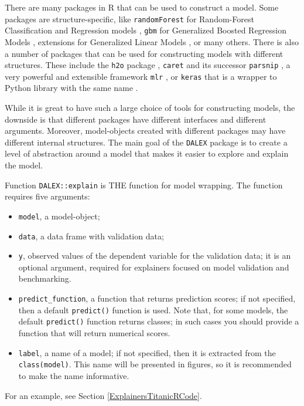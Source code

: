 \documentclass[12pt,]{krantz}
\providecommand{\tightlist}{%
  \setlength{\itemsep}{0pt}\setlength{\parskip}{0pt}}
\begin{document}
There are many packages in R that can be used to construct a model. Some packages are structure-specific, like \texttt{randomForest} for Random-Forest Classification and Regression models \citep{randomForest}, \texttt{gbm} for Generalized Boosted Regression Models \citep{gbm}, extensions for Generalized Linear Models \citep{rms}, or many others. There is also a number of packages that can be used for constructing models with different structures. These include the \texttt{h2o} package \citep{h2oPackage}, \texttt{caret} \citep{caret} and its successor \texttt{parsnip} \citep{parsnipPackage}, a very powerful and extensible framework \texttt{mlr} \citep{mlr}, or \texttt{keras} that is a wrapper to Python library with the same name \citep{kerasPackage}.

While it is great to have such a large choice of tools for constructing models, the downside is that different packages have different interfaces and different arguments. Moreover, model-objects created with different packages may have different internal structures. The main goal of the \texttt{DALEX} package is to create a level of abstraction around a model that makes it easier to explore and explain the model.

Function \texttt{DALEX::explain} is THE function for model wrapping. The function requires five arguments:

\begin{itemize}
\tightlist
\item
  \texttt{model}, a model-object;
\item
  \texttt{data}, a data frame with validation data;
\item
  \texttt{y}, observed values of the dependent variable for the validation data; it is an optional argument, required for explainers focused on model validation and benchmarking.
\item
  \texttt{predict\_function}, a function that returns prediction scores; if not specified, then a default \texttt{predict()} function is used. Note that, for some models, the default \texttt{predict()} function returns classes; in such cases you should provide a function that will return numerical scores.
\item
  \texttt{label}, a name of a model; if not specified, then it is extracted from the \texttt{class(model)}. This name will be presented in figures, so it is recommended to make the name informative.
\end{itemize}

For an example, see Section \ref{ExplainersTitanicRCode}.
\end{document}
